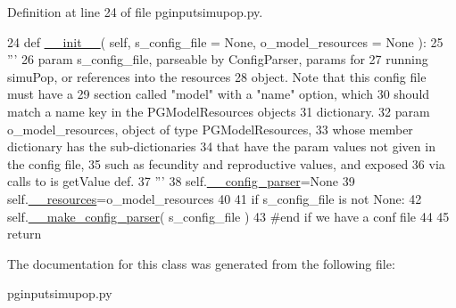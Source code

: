 Definition at line 24 of file pginputsimupop.\+py.


\begin{DoxyCode}
24     \textcolor{keyword}{def }\hyperlink{classpginputsimupop_1_1PGInputSimuPop_a2ad2ad5300386fff5ab889a61f9b2d7d}{\_\_init\_\_}( self, s\_config\_file = None, o\_model\_resources = None ):
25         \textcolor{stringliteral}{'''}
26 \textcolor{stringliteral}{        param s\_config\_file, parseable by ConfigParser, params for }
27 \textcolor{stringliteral}{            running simuPop, or references into the resources}
28 \textcolor{stringliteral}{            object.  Note that this config file must have a}
29 \textcolor{stringliteral}{            section called "model" with a "name" option, which}
30 \textcolor{stringliteral}{            should match a name key in the PGModelResources objects}
31 \textcolor{stringliteral}{            dictionary.}
32 \textcolor{stringliteral}{        param o\_model\_resources, object of type PGModelResources,}
33 \textcolor{stringliteral}{            whose member dictionary has the sub-dictionaries}
34 \textcolor{stringliteral}{            that have the param values not given in the config file,}
35 \textcolor{stringliteral}{            such as fecundity and reproductive values, and exposed}
36 \textcolor{stringliteral}{            via calls to is getValue def.}
37 \textcolor{stringliteral}{        '''}
38         self.\hyperlink{classpginputsimupop_1_1PGInputSimuPop_a0d111a60f9d70820d7f2bcb5403f66fe}{\_\_config\_parser}=\textcolor{keywordtype}{None}
39         self.\hyperlink{classpginputsimupop_1_1PGInputSimuPop_aeeb127614d2afa7ffddbd022a0785a0c}{\_\_resources}=o\_model\_resources
40         
41         \textcolor{keywordflow}{if} s\_config\_file \textcolor{keywordflow}{is} \textcolor{keywordflow}{not} \textcolor{keywordtype}{None}:
42             self.\hyperlink{classpginputsimupop_1_1PGInputSimuPop_a3dd20c13092b6cef99ccab765bdd8dc8}{\_\_make\_config\_parser}( s\_config\_file )
43         \textcolor{comment}{#end if we have a conf file}
44 
45         \textcolor{keywordflow}{return}
\end{DoxyCode}


The documentation for this class was generated from the following file\+:\begin{DoxyCompactItemize}
\item 
pginputsimupop.\+py\end{DoxyCompactItemize}
